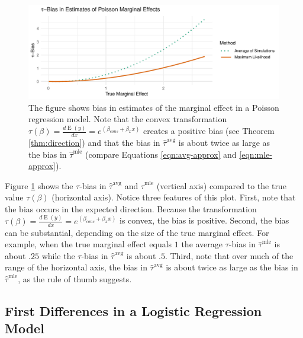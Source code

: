 \documentclass[11pt]{article}
\DeclareMathOperator*{\E}{\text{E}}
\begin{document}
\begin{figure}[h!]
\begin{center}
\includegraphics[scale = 0.65]{figs/poisson-mcs.pdf}
\vspace{.1in}
\caption{The figure shows bias in estimates of the marginal effect in a Poisson regression model.
Note that the convex transformation $\tau(\beta) = \frac{d \E (y)}{dx} = e^{(\beta_{cons} + \beta_x x)}$ creates a positive bias (see Theorem \ref{thm:direction}) and that the bias in $\hat{\tau}^\text{avg}$ is about twice as large as the bias in $\hat{\tau}^\text{mle}$ (compare Equations \ref{eqn:avg-approx} and \ref{eqn:mle-approx}).}\label{fig:poisson-mcs}
\end{center}
\end{figure}

Figure \ref{fig:poisson-mcs} shows the $\tau$-bias in $\hat{\tau}^\text{avg}$ and $\hat{\tau}^\text{mle}$ (vertical axis) compared to the true value $\tau(\beta)$ (horizontal axis).
Notice three features of this plot.
First, note that the bias occurs in the expected direction.
Because the transformation $\tau(\beta) = \frac{d \E (y)}{dx} = e^{(\beta_{cons} + \beta_x x)}$ is convex, the bias is positive.
Second, the bias can be substantial, depending on the size of the true marginal effect.
For example, when the true marginal effect equals $1$ the average  $\tau$-bias in $\hat{\tau}^\text{mle}$ is about $.25$ while the $\tau$-bias in $\hat{\tau}^\text{avg}$ is about $.5$.
Third, note that over much of the range of the horizontal axis, the bias in $\hat{\tau}^\text{avg}$ is about twice as large as the bias in $\hat{\tau}^\text{mle}$, as the rule of thumb suggests.



\subsection*{First Differences in a Logistic Regression Model}
\end{document}
